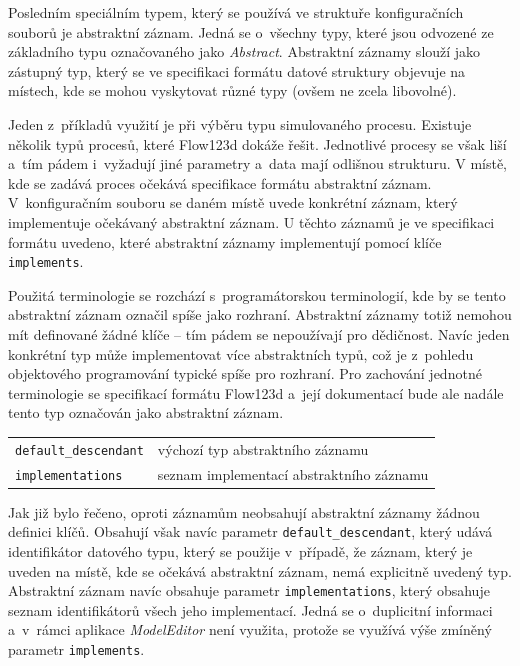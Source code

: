 \documentclass[FM,bw,DP]{tulthesis}
\begin{document}
Posledním speciálním typem, který se používá ve struktuře konfiguračních souborů je abstraktní záznam. Jedná se o~všechny typy, které jsou odvozené ze základního typu označovaného jako \textit{Abstract}. Abstraktní záznamy slouží jako zástupný typ, který se ve specifikaci formátu datové struktury objevuje na místech, kde se mohou vyskytovat různé typy (ovšem ne zcela libovolné).


Jeden z~příkladů využití je při výběru typu simulovaného procesu. Existuje několik typů procesů, které Flow123d dokáže řešit. Jednotlivé procesy se však liší a~tím pádem i~vyžadují jiné parametry a~data mají odlišnou strukturu.
V místě, kde se zadává proces očekává specifikace formátu abstraktní záznam.
V~konfiguračním souboru se daném místě uvede konkrétní záznam, který implementuje očekávaný abstraktní záznam. U těchto záznamů je ve specifikaci formátu uvedeno, které abstraktní záznamy implementují pomocí klíče \texttt{implements}.


Použitá terminologie se rozchází s~programátorskou terminologií, kde by se tento abstraktní záznam označil spíše jako rozhraní. Abstraktní záznamy totiž nemohou mít definované žádné klíče -- tím pádem se nepoužívají pro dědičnost. Navíc jeden konkrétní typ může implementovat více abstraktních typů, což je z~pohledu objektového programování typické spíše pro rozhraní. Pro zachování jednotné terminologie se specifikací formátu Flow123d a~její dokumentací bude ale nadále tento typ označován jako abstraktní záznam.

\vspace{0.5cm}
\begin{tabular}{m{5cm}@{}l}
\texttt{default\_descendant}\dotfill & výchozí typ abstraktního záznamu \\
\texttt{implementations}\dotfill & seznam implementací abstraktního záznamu \\
\end{tabular}
\vspace{0.5cm}

Jak již bylo řečeno, oproti záznamům neobsahují abstraktní záznamy žádnou definici klíčů. Obsahují však navíc parametr \texttt{default\_descendant}, který udává identifikátor datového typu, který se použije v~případě, že záznam, který je uveden na místě, kde se očekává abstraktní záznam, nemá explicitně uvedený typ. Abstraktní záznam navíc obsahuje parametr \texttt{implementations}, který obsahuje seznam identifikátorů všech jeho implementací. Jedná se o~duplicitní informaci a~v~rámci aplikace \textit{ModelEditor} není využita, protože se využívá výše zmíněný parametr \texttt{implements}.
\end{document}
